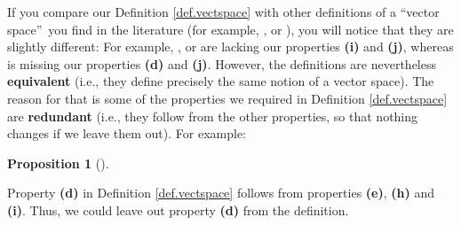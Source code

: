 \documentclass[numbers=enddot,12pt,final,onecolumn,notitlepage]{scrartcl}%
\theoremstyle{definition}
\newtheorem{prop}[theo]{Proposition}
\newenvironment{proposition}[1][]
{\begin{prop}[#1]\begin{leftbar}}
{\end{leftbar}\end{prop}}
\begin{document}
If you compare our Definition \ref{def.vectspace} with other definitions of a
\textquotedblleft vector space\textquotedblright\ you find in the literature
(for example, \cite[Definition 4.1.1]{LaNaSc16}, \cite[Definition
2.1]{OlvSha06} or \cite[Definition Two.I.1]{Heffer16}), you will notice that
they are slightly different: For example, \cite[Definition 4.1.1]{LaNaSc16},
\cite[Definition 2.1]{OlvSha06} or \cite[Definition Two.I.1]{Heffer16} are
lacking our properties \textbf{(i)} and \textbf{(j)}, whereas \cite[Definition
2.3.1]{Kowals16} is missing our properties \textbf{(d)} and \textbf{(j)}.
However, the definitions are nevertheless \textbf{equivalent} (i.e., they
define precisely the same notion of a vector space). The reason for that is
some of the properties we required in Definition \ref{def.vectspace} are
\textbf{redundant} (i.e., they follow from the other properties, so that
nothing changes if we leave them out). For example:

\begin{proposition}
\label{prop.vectspace.redundant.d}Property \textbf{(d)} in Definition
\ref{def.vectspace} follows from properties \textbf{(e)}, \textbf{(h)} and
\textbf{(i)}. Thus, we could leave out property \textbf{(d)} from the definition.
\end{proposition}
\end{document}

